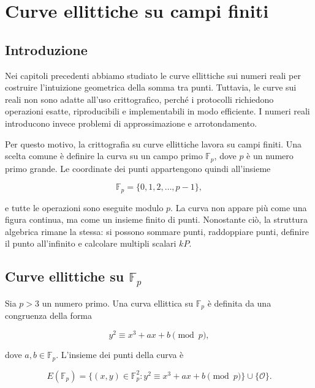 \documentclass[12pt,a4paper,oneside]{report}
\begin{document}
\chapter{Curve ellittiche su campi finiti}

\section{Introduzione}

Nei capitoli precedenti abbiamo studiato le curve ellittiche sui numeri reali per costruire l'intuizione geometrica della somma tra punti. Tuttavia, le curve sui reali non sono adatte all'uso crittografico, perché i protocolli richiedono operazioni esatte, riproducibili e implementabili in modo efficiente. I numeri reali introducono invece problemi di approssimazione e arrotondamento.

Per questo motivo, la crittografia su curve ellittiche lavora su campi finiti. Una scelta comune è definire la curva su un campo primo \(\mathbb{F}_p\), dove \(p\) è un numero primo grande. Le coordinate dei punti appartengono quindi all'insieme

\[
\mathbb{F}_p=\{0,1,2,\ldots,p-1\},
\]

e tutte le operazioni sono eseguite modulo \(p\). La curva non appare più come una figura continua, ma come un insieme finito di punti. Nonostante ciò, la struttura algebrica rimane la stessa: si possono sommare punti, raddoppiare punti, definire il punto all'infinito e calcolare multipli scalari \(kP\).

\section{Curve ellittiche su \texorpdfstring{\(\mathbb{F}_p\)}{Fp}}

Sia \(p>3\) un numero primo. Una curva ellittica su \(\mathbb{F}_p\) è definita da una congruenza della forma

\begin{equation}
    y^2 \equiv x^3+ax+b \pmod p,
    \label{eq:ec-fp}
\end{equation}

dove \(a,b\in\mathbb{F}_p\). L'insieme dei punti della curva è

\begin{equation}
    E(\mathbb{F}_p)=
    \{(x,y)\in\mathbb{F}_p^2 : y^2\equiv x^3+ax+b \pmod p\}
    \cup\{\mathcal{O}\}.
\end{equation}
\end{document}
